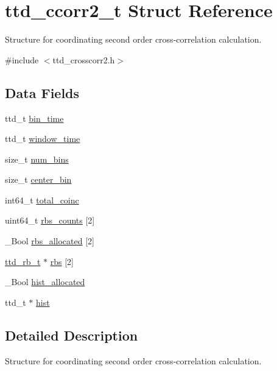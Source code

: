 \hypertarget{structttd__ccorr2__t}{}\section{ttd\+\_\+ccorr2\+\_\+t Struct Reference}
\label{structttd__ccorr2__t}


Structure for coordinating second order cross-\/correlation calculation.  




{\ttfamily \#include $<$ttd\+\_\+crosscorr2.\+h$>$}

\subsection*{Data Fields}
\begin{DoxyCompactItemize}
\item 
ttd\+\_\+t \hyperlink{structttd__ccorr2__t_ad92442a4ab2d08d4d15e6b32442a15eb}{bin\+\_\+time}
\item 
ttd\+\_\+t \hyperlink{structttd__ccorr2__t_a2afa4d3a622ea10c731181ecaefc63c3}{window\+\_\+time}
\item 
size\+\_\+t \hyperlink{structttd__ccorr2__t_a811a546cf1b2cf24a6c907c4917932ef}{num\+\_\+bins}
\item 
size\+\_\+t \hyperlink{structttd__ccorr2__t_ade85728d8ba11808be8abbdb876d7d5d}{center\+\_\+bin}
\item 
int64\+\_\+t \hyperlink{structttd__ccorr2__t_a127fca4b0a397dc24cf6c3165273ca97}{total\+\_\+coinc}
\item 
uint64\+\_\+t \hyperlink{structttd__ccorr2__t_a8413d9d1551e1fafbaf6d168ca997b0c}{rbs\+\_\+counts} \mbox{[}2\mbox{]}
\item 
\+\_\+\+Bool \hyperlink{structttd__ccorr2__t_a929ec0473292ca0d1826513116842207}{rbs\+\_\+allocated} \mbox{[}2\mbox{]}
\item 
\hyperlink{structttd__rb__t}{ttd\+\_\+rb\+\_\+t} $\ast$ \hyperlink{structttd__ccorr2__t_aa64b2c0039a6466a4d15e18e1d4e22cf}{rbs} \mbox{[}2\mbox{]}
\item 
\+\_\+\+Bool \hyperlink{structttd__ccorr2__t_a171c849ac19bc37d49c0d6de41d64057}{hist\+\_\+allocated}
\item 
ttd\+\_\+t $\ast$ \hyperlink{structttd__ccorr2__t_a6670bb2f511309d52c6c0cf9ccc9cf43}{hist}
\end{DoxyCompactItemize}


\subsection{Detailed Description}
Structure for coordinating second order cross-\/correlation calculation. 

